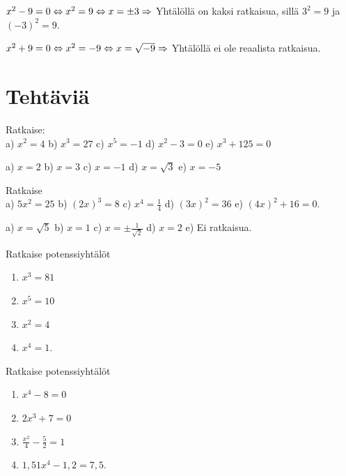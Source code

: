\begin{esimerkki}
$x^2 - 9 = 0 \Leftrightarrow x^2 = 9 \Leftrightarrow x = \pm 3 \\
\Rightarrow$ Yhtälöllä on kaksi ratkaisua, sillä $3^2 = 9$ ja $(-3)^2 = 9$.
\end{esimerkki}

\begin{esimerkki}
$x^2 + 9 = 0 \Leftrightarrow x^2 = -9 \Leftrightarrow x = \sqrt{-9} \\
\Rightarrow$ Yhtälöllä ei ole reaalista ratkaisua.
\end{esimerkki}

\section*{Tehtäviä}

\begin{tehtava}
Ratkaise: \\
a) $ x^2 = 4 $ \qquad
b) $ x^3 = 27 $ \qquad
c) $ x^5 = -1 $ \qquad
d) $ x^2 - 3 = 0 $ \qquad
e) $ x^3 + 125 = 0 $
\begin{vastaus}
a) $ x = 2 $ \qquad
b) $ x = 3 $ \qquad
c) $ x = -1 $ \qquad
d) $ x = \sqrt{3} $ \qquad
e) $ x = -5 $ 
\end{vastaus}
\end{tehtava}

\begin{tehtava}
Ratkaise \\
a) $ 5x^2 = 25 $ \qquad
b) $ (2x)^3 = 8 $ \qquad
c) $ x^4 = \frac{1}{4} $ \qquad
d) $ (3x)^2 = 36 $ \qquad
e) $ (4x)^2 + 16 = 0 $.
\begin{vastaus}
a) $ x = \sqrt{5} $ \qquad
b) $ x = 1 $ \qquad
c) $ x = \pm\frac{1}{\sqrt{2}} $ \qquad
d) $ x = 2 $ \qquad
e) Ei ratkaisua. 
\end{vastaus}
\end{tehtava}

\begin{tehtava}
Ratkaise potenssiyhtälöt
\begin{enumerate}
\item $x^3 = 81$
\item $x^5 = 10$
\item $x^2 = 4$
\item $x^4 = 1$.
\end{enumerate}
\end{tehtava}

\begin{tehtava}
Ratkaise potenssiyhtälöt
\begin{enumerate}
\item $x^4 - 8 = 0$
\item $2x^3 + 7 = 0$
\item $\frac{x^2}{4} - \frac{5}{2} = 1$
\item $1,51 x^4 - 1,2 = 7,5$.
\end{enumerate}
\end{tehtava}

